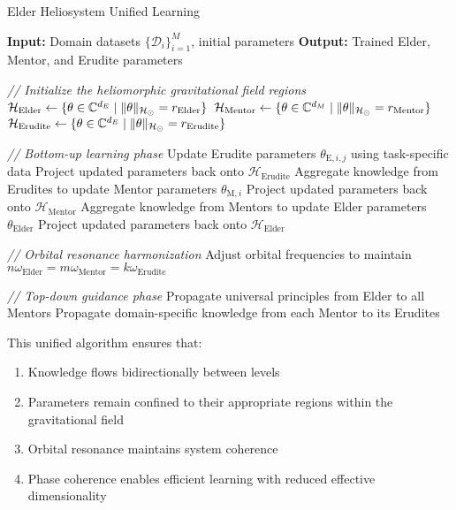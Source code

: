 \begin{algorithm}
\caption{Elder Heliosystem Unified Learning}
\begin{algorithmic}[1]
\State \textbf{Input:} Domain datasets $\{\mathcal{D}_i\}_{i=1}^M$, initial parameters 
\State \textbf{Output:} Trained Elder, Mentor, and Erudite parameters

\State \textit{// Initialize the heliomorphic gravitational field regions}
\State $\mathcal{H}_{\text{Elder}} \gets \{\theta \in \mathbb{C}^{d_E} \mid \|\theta\|_{\mathcal{H}_{\odot}} = r_{\text{Elder}}\}$
\State $\mathcal{H}_{\text{Mentor}} \gets \{\theta \in \mathbb{C}^{d_M} \mid \|\theta\|_{\mathcal{H}_{\odot}} = r_{\text{Mentor}}\}$
\State $\mathcal{H}_{\text{Erudite}} \gets \{\theta \in \mathbb{C}^{d_E} \mid \|\theta\|_{\mathcal{H}_{\odot}} = r_{\text{Erudite}}\}$

    \State \textit{// Bottom-up learning phase}
            \State Update Erudite parameters $\theta_{\text{E},i,j}$ using task-specific data
            \State Project updated parameters back onto $\mathcal{H}_{\text{Erudite}}$
        \EndFor
        \State Aggregate knowledge from Erudites to update Mentor parameters $\theta_{\text{M},i}$
        \State Project updated parameters back onto $\mathcal{H}_{\text{Mentor}}$
    \EndFor
    \State Aggregate knowledge from Mentors to update Elder parameters $\theta_{\text{Elder}}$
    \State Project updated parameters back onto $\mathcal{H}_{\text{Elder}}$
    
    \State \textit{// Orbital resonance harmonization}
    \State Adjust orbital frequencies to maintain $n\omega_{\text{Elder}} = m\omega_{\text{Mentor}} = k\omega_{\text{Erudite}}$
    
    \State \textit{// Top-down guidance phase}
    \State Propagate universal principles from Elder to all Mentors
    \State Propagate domain-specific knowledge from each Mentor to its Erudites
\EndFor
\end{algorithmic}
\end{algorithm}

This unified algorithm ensures that:

\begin{enumerate}
    \item Knowledge flows bidirectionally between levels
    \item Parameters remain confined to their appropriate regions within the gravitational field
    \item Orbital resonance maintains system coherence
    \item Phase coherence enables efficient learning with reduced effective dimensionality
\end{enumerate}

